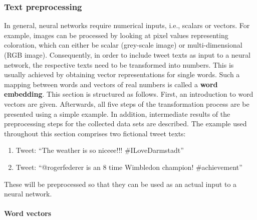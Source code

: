 \subsubsection{Text preprocessing}
\label{sub:text_preprocessing}

In general, neural networks require numerical inputs, i.e., scalars or vectors.
For example, images can be processed by looking at pixel values representing
coloration, which can either be scalar (grey-scale image) or multi-dimensional
(RGB image).
Consequently, in order to include tweet texts as input to a neural network,
the respective texts need to be transformed into numbers.
This is usually achieved by obtaining vector representations for single words.
Such a mapping between words and vectors of real numbers is called a \textbf{word
embedding}.
This section is structured as follows.
First, an introduction to word vectors are given.
Afterwards, all five steps of the transformation process are be presented using a simple example.
In addition, intermediate results of the preprocessing steps for the collected
data sets are described.
The example used throughout this section comprises two fictional tweet texts:

\begin{enumerate}
  \item Tweet: ``The weather is so niceee!!! \#ILoveDarmstadt''
  \item Tweet: ``@rogerfederer is an 8 time Wimbledon champion! \#achievement''
\end{enumerate}

These will be preprocessed so that they can be used as an actual input to a neural network.

\paragraph{Word vectors}
\label{sub:word_vectors}



